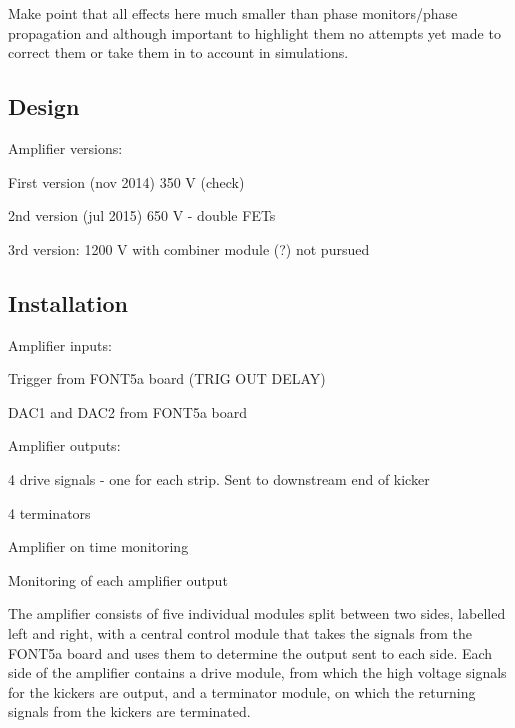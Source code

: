 
Make point that all effects here much smaller than phase monitors/phase propagation and although important to highlight them no attempts yet made to correct them or take them in to account in simulations.

\subsection{Design}
\label{ss:ampDesign}

Amplifier versions:

First version (nov 2014) 350 V (check)

2nd version  (jul 2015) 650 V - double FETs

3rd version: 1200 V with combiner module (?) not pursued

\subsection{Installation}
\label{ss:ampInstallation}


Amplifier inputs:

Trigger from FONT5a board (TRIG OUT DELAY)

DAC1 and DAC2 from FONT5a board


Amplifier outputs:

4 drive signals - one for each strip. Sent to downstream end of kicker

4 terminators

Amplifier on time monitoring

Monitoring of each amplifier output

The amplifier consists of five individual modules split between two sides, labelled left and right, with a central control module that takes the signals from the FONT5a board and uses them to determine the output sent to each side. Each side of the amplifier contains a drive module, from which the high voltage signals for the kickers are output, and a terminator module,  on which the returning signals from the kickers are terminated. 

